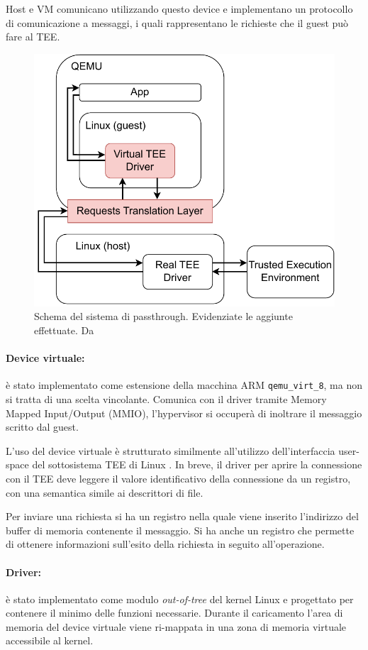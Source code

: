 \documentclass[12pt,italian]{report}
\begin{document}
	Host e VM comunicano utilizzando questo device e implementano un protocollo di comunicazione a messaggi, i quali rappresentano le richieste che il guest può fare al TEE.

	\begin{figure}[h]
		\centering
		\includegraphics[width=0.7\linewidth]{immagini/tee-passthrough-schema}
		\caption{
			Schema del sistema di passthrough. Evidenziate le aggiunte effettuate. Da \cite{tesi_cutecchia}
		}
		\label{fig:passthrough-schema}
	\end{figure}

	\paragraph{Device virtuale:} è stato implementato come estensione della macchina ARM \texttt{qemu\_virt\_8}, ma non si tratta di una scelta vincolante. Comunica con il driver tramite Memory Mapped Input/Output (MMIO), l'hypervisor si occuperà di inoltrare il messaggio scritto dal guest.

	L'uso del device virtuale è strutturato similmente all'utilizzo dell'interfaccia user-space del sottosistema TEE di Linux \cite{linux_tee_subsystem}. In breve, il driver per aprire la connessione con il TEE deve leggere il valore identificativo della connessione da un registro, con una semantica simile ai descrittori di file. 

	Per inviare una richiesta si ha un registro nella quale viene inserito l'indirizzo del buffer di memoria contenente il messaggio. Si ha anche un registro che permette di ottenere informazioni sull'esito della richiesta in seguito all'operazione.

	\paragraph{Driver:} è stato implementato come modulo \textit{out-of-tree} del kernel Linux e progettato per contenere il minimo delle funzioni necessarie. Durante il caricamento l'area di memoria del device virtuale viene ri-mappata in una zona di memoria virtuale accessibile al kernel.
\end{document}
